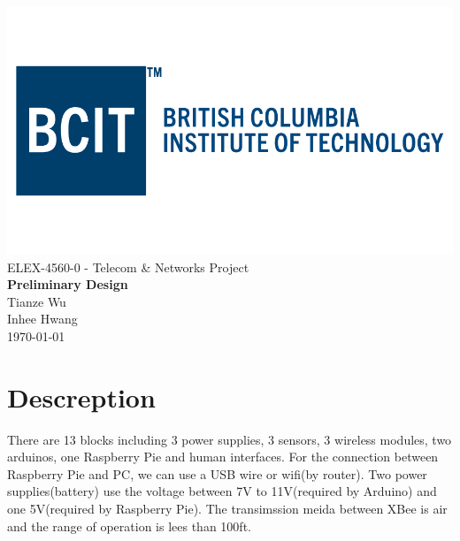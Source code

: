 \documentclass[letterpaper,12pt,notitlepage]{article}
\begin{document}
\begin{titlepage}
	\vspace{5cm}
	\begin{center}
		\includegraphics[scale=0.4]{bcit.png}\\

		\huge{ELEX-4560-0 - Telecom \& Networks Project}\\
		\vspace{10mm}
		\large{\textbf{Preliminary Design}}\\
		\vspace{10mm}
		\large{Tianze Wu}\\
		\vspace{5mm}
		Inhee Hwang\\
		\vspace{5mm}
		\today

	\end{center}
\end{titlepage}


\clearpage 
\section*{Descreption}
\par There are 13 blocks including 3 power supplies, 3 sensors, 3 wireless modules, 
two arduinos, one Raspberry Pie and human interfaces. For the connection between Raspberry Pie 
and PC, we can use a USB wire or wifi(by router). Two power supplies(battery) use the 
voltage between 7V to 11V(required by Arduino) and one 5V(required by Raspberry Pie). 
The transimssion meida between XBee is air and the range of operation is lees than 100ft. 
\end{document}
